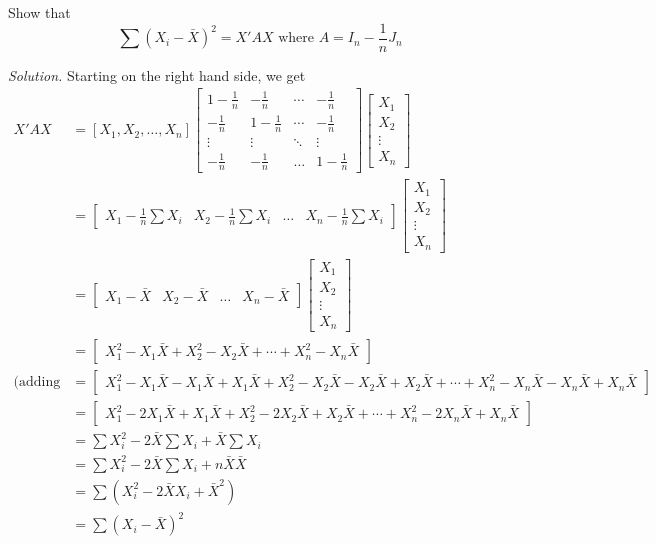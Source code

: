 \documentclass{article}
\begin{document}
\setlength{\parindent}{0cm}   %

Show that
\[
\sum(X_i - \bar X)^2 = X'AX  \text{ where  } A = I_n - \frac1nJ_n
\]


\vspace{4mm} 

\textit{Solution.} Starting on the right hand side, we get 
\begin{align*}
X'AX &= [X_1, X_2, \ldots, X_n]\begin{bmatrix}
1-\frac1n & -\frac1n & \cdots & -\frac1n \\
 -\frac1n & 1  -\frac1n & \cdots &  -\frac1n\\
 \vdots & \vdots & \ddots & \vdots \\
  -\frac1n&  -\frac1n &  \hdots & 1 -\frac1n
  \end{bmatrix} 
\begin{bmatrix}
X_1\\
X_2\\
\vdots \\
X_n
\end{bmatrix} \\
&=\begin{bmatrix}
X_1-\frac1n\sum X_i & X_2-\frac1n\sum X_i & \ldots & X_n-\frac1n\sum X_i 
\end{bmatrix}\begin{bmatrix}
X_1\\
X_2\\
\vdots \\
X_n
\end{bmatrix}\\
&= \begin{bmatrix}
X_1-\bar X & X_2-\bar X& \ldots & X_n-\bar X
\end{bmatrix}\begin{bmatrix}
X_1\\
X_2\\
\vdots \\
X_n
\end{bmatrix}\\ 
&=\begin{bmatrix}
X_1^2-X_1\bar X + X_2^2-X_2\bar X + \cdots + X_n^2-X_n\bar X 
\end{bmatrix}   \\
(\text{adding zero this step)}&= \begin{bmatrix}
X_1^2-X_1\bar X -X_1\bar X + X_1 \bar X + X_2^2-X_2\bar X -X_2\bar X + X_2 \bar X+ \cdots + X_n^2-X_n\bar X -X_n\bar X + X_n \bar X
\end{bmatrix} \\
&=  \begin{bmatrix}
X_1^2-2X_1\bar X  + X_1 \bar X + X_2^2-2X_2\bar X + X_2 \bar X+ \cdots + X_n^2 -2X_n\bar X + X_n \bar X
\end{bmatrix}\\
&= \sum X_i^2 -2\bar X \sum X_i + \bar X \sum X_i \\
&=  \sum X_i^2 -2\bar X \sum X_i + n\bar X \bar X \\
&= \sum( X_i^2 - 2 \bar X X_i + \bar X^2) \\ 
&= \sum ( X_i - \bar X)^2 
\end{align*} 
\end{document}
